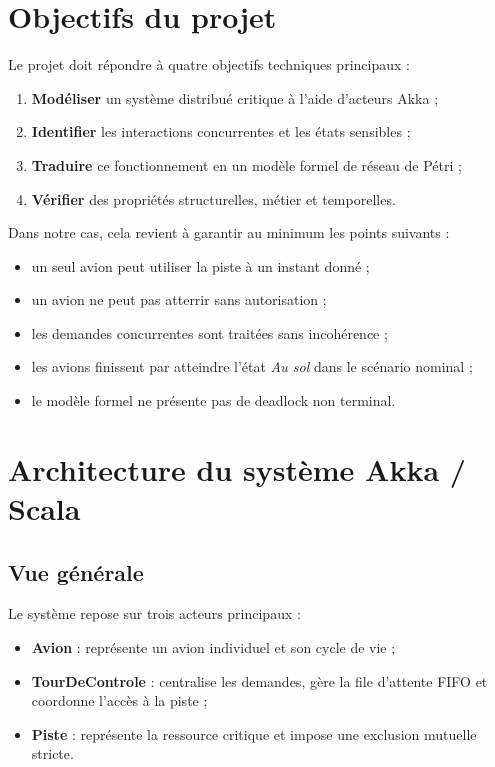 \documentclass[11pt,a4paper]{article}
\begin{document}
\section{Objectifs du projet}

Le projet doit répondre à quatre objectifs techniques principaux :
\begin{enumerate}
    \item \textbf{Modéliser} un système distribué critique à l'aide d'acteurs Akka ;
    \item \textbf{Identifier} les interactions concurrentes et les états sensibles ;
    \item \textbf{Traduire} ce fonctionnement en un modèle formel de réseau de Pétri ;
    \item \textbf{Vérifier} des propriétés structurelles, métier et temporelles.
\end{enumerate}

Dans notre cas, cela revient à garantir au minimum les points suivants :
\begin{itemize}
    \item un seul avion peut utiliser la piste à un instant donné ;
    \item un avion ne peut pas atterrir sans autorisation ;
    \item les demandes concurrentes sont traitées sans incohérence ;
    \item les avions finissent par atteindre l'état \emph{Au sol} dans le scénario nominal ;
    \item le modèle formel ne présente pas de deadlock non terminal.
\end{itemize}

\section{Architecture du système Akka / Scala}

\subsection{Vue générale}

Le système repose sur trois acteurs principaux :
\begin{itemize}
    \item \textbf{Avion} : représente un avion individuel et son cycle de vie ;
    \item \textbf{TourDeControle} : centralise les demandes, gère la file d'attente FIFO et coordonne l'accès à la piste ;
    \item \textbf{Piste} : représente la ressource critique et impose une exclusion mutuelle stricte.
\end{itemize}
\end{document}
